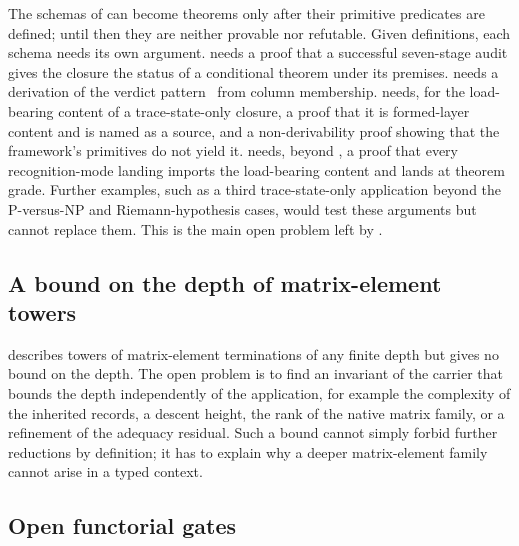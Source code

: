 The schemas of  can become theorems only after
their primitive predicates are defined; until then they are neither
provable nor refutable.  Given definitions, each schema needs its own
argument.   needs a proof that a
successful seven-stage audit gives the closure the status of a
conditional theorem under its premises.  
needs a derivation of the verdict pattern \SigPattern\ from column
membership.   needs, for the
load-bearing content of a trace-state-only closure, a proof that it is
formed-layer content and is named as a source, and a non-derivability
proof showing that the framework's primitives do not yield it.
 needs, beyond
, a proof that every recognition-mode
landing imports the load-bearing content and lands at theorem grade.
Further examples, such as a third trace-state-only application beyond
the P-versus-NP and Riemann-hypothesis cases, would test these
arguments but cannot replace them.  This is the main open problem left
by .

\subsection{A bound on the depth of matrix-element towers}
\label{sec:predictions:ctmt-depth-bound}

 describes towers of matrix-element
terminations of any finite depth but gives no bound on the depth.  The
open problem is to find an invariant of the carrier
that bounds the depth independently of the application, for example the
complexity of the inherited records, a descent height, the rank of the
native matrix family, or a refinement of the adequacy residual.  Such a
bound cannot simply forbid further reductions by definition; it has to
explain why a deeper matrix-element family cannot arise in a typed
context.

\subsection{Open functorial gates}
\label{sec:predictions:functorial-gates}

